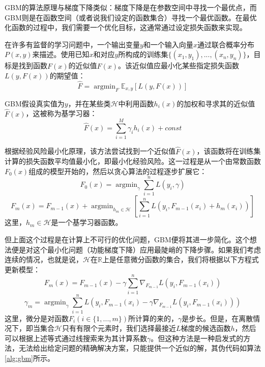   GBM的算法原理与梯度下降类似：梯度下降是在参数空间中寻找一个最优点，而GBM则是在函数空间（或者说我们设定的函数集合）寻找一个最优函数。在最优化函数的过程中，我们需要一个优化目标，这通常通过设定损失函数来实现。

  在许多有监督的学习问题中，一个输出变量$y$和一个输入向量$x$通过联合概率分布$P(x,y)$来描述。使用已知$x$和对应$y$所构成的训练集$\{(x_{1},y_{1}),...,(x_{n},y_{n})\}$，目标是找到函数$F(x)$的近似值$\hat{F}(x)$。该近似值应最小化某些指定损失函数$L(y,F(x))$的期望值：
\begin{equation}
  \hat{F} = \mathop{\arg\min}_{F}\mathbb{E}_{x,y}[L(y,F(x))]
\end{equation}

  GBM假设真实值为$y$，并在某些类$\mathcal{H}$中利用函数$h_{i}(x)$的加权和寻求其的近似值$\hat{F}(x)$，这被称为基学习器：
\begin{equation}
  \hat{F}(x) = \sum^{M}_{i=1}\gamma_{i}h_{i}(x) + const
\end{equation}

  根据经验风险最小化原理，该方法尝试找到一个近似值$\hat{F}(x)$，该函数将在训练集计算的损失函数平均值最小化，即最小化经验风险。这一过程是从一个由常数函数$F_{0}(x)$组成的模型开始的，然后以贪心算法的过程逐步扩展它：
\begin{equation}
  F_{0}(x) = \mathop{\arg\min}_{\gamma}\sum^{n}_{i=1}L(y_{i},\gamma)
\end{equation}
\begin{equation}
  F_{m}(x) = F_{m-1}(x) + \mathop{\arg\min}_{h_{m}\in{\mathcal{H}}}\left[\sum^{n}_{i=1}L(y_{i},F_{m-1}(x_{i}) + h_{m}(x_{i}))\right]
\end{equation}
这里，$h_{m}\in{\mathcal{H}}$是一个基学习器函数。

  但上面这个过程是在计算上不可行的优化问题，GBM便将其进一步简化。这个想法便是对这个最小化问题（功能梯度下降）应用最陡峭的下降步骤。如果我们考虑连续的情况，也就是说，$\mathcal{H}$在$\mathbb{R}$上是任意微分函数的集合，我们将根据以下方程式更新模型：
\begin{equation}
  F_{m}(x) = F_{m-1}(x) - \gamma\sum^{n}_{i=1}{\nabla}_{F_{m-1}}L(y_{i},F_{m-1}(x_{i}))
\end{equation}
\begin{equation}
  {\gamma}_{m} = \mathop{\arg\min}_{\gamma}\sum^{n}_{i=1}L(y_{i},F_{m-1}(x_{i}) - \gamma{\nabla}_{F_{m-1}}L(y_{i},F_{m-1}(x_{i})))
\end{equation}
这里，微分是对函数$F_{i}(i\in\{1,...,m\})$所计算的来的，$\gamma$是步长。但是，在离散情况下，即当集合$\mathcal{H}$只有有限个元素时，我们选择最接近$L$梯度的候选函数$h$，然后可以根据上述等式通过线搜索来为其计算系数$\gamma$。但这种方法是一种启发式的方法，无法给出给定问题的精确解决方案，只能提供一个近似的解，其伪代码如算法\ref{alg:gbm}所示。

